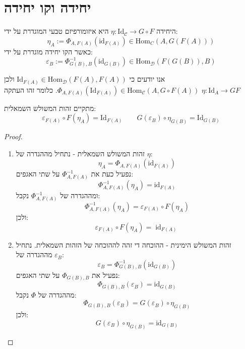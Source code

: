 \documentclass{tstextbook}
\begin{document}
\section{יחידה וקו יחידה}

\begin{definition}
היחידה \(\eta:\mathrm{Id}_{\mathcal{C}}\to G \circ F\) היא איזומורפיזם טבעי המוגדרת על ידי:
$$\eta_{A}:=\Phi_{A,F(A)}(\mathrm{id}_{F(A)})\in\mathrm{Hom}_{C}(A,G(F(A)))$$
כאשר הקו יחידה מוגדרת על ידי:
$$\varepsilon_{B}:=\Phi_{G(B),B}^{-1}(\mathrm{id}_{G(B)})\in\mathrm{Hom}_{\mathcal{D}}(F(G(B)),B)$$

\end{definition}
\begin{remark}
אנו יודעים כי \(\mathrm{Id}_{F(A)}\in\mathrm{Hom}_{\mathcal{D}}(F(A),F(A))\) ולכן \(\Phi_{A,F(A)}\left( \mathrm{Id}_{F(A)} \right)\in \mathrm{Hom}_{\mathcal{C}}\left( A,G\circ F(A) \right)\). כלומר זהו העתקה \(\eta:\mathrm{Id}_{A}\to GF\)

\end{remark}
\begin{proposition}
מתקיים זהות המשולש השמאלית:
$$\varepsilon_{F(A)}\circ  F(\eta_{A})=\mathrm{Id}_{F(A)}\qquad G(\varepsilon_{B})\circ \eta_{G(B)}=\mathrm{Id}_{G(B)}$$

\end{proposition}
\begin{proof}
  \begin{enumerate}
    \item זהות המשולש השמאלית - נתחיל מההגדרה של \(\eta\): 
$$\eta_{A}=\Phi_{A,F(A)}(\mathrm{id}_{F(A)})$$
נפעיל כעת את \(\Phi ^{-1}_{A,F(A)}\) על שתי האגפים:
$$\Phi_{A,F(A)}^{-1}(\eta_{A})=\mathrm{id}_{F(A)}$$
ומההגדרה של \(\Phi ^{-1}_{A,F(A)}\) נקבל:
$$\Phi_{A,F(A)}^{-1}(\eta_{A})=\varepsilon_{F(A)}\circ F(\eta_{A})$$
ולכן:
$$\varepsilon_{F(A)}\circ F(\eta_{A})=\operatorname{id}_{F(A)}$$


    \item זהות המשולש הימינית - ההוכחה די זהה לההוכחה של הזהות השמאלית. נתחיל מההגדרה של \(\varepsilon_{B}\): 
$$\varepsilon_{B}=\Phi_{G(B),B}^{-1}(\mathrm{id}_{G(B)})$$
נפעיל את \(\Phi_{G(B),B}\) על שתי האגפים:
$$\Phi_{G(B),B}(\varepsilon_{B})=\mathrm{id}_{G(B)}$$
מההגדרה של \(\Phi\) נקבל:
$$\Phi_{G(B),B}(\varepsilon_{B})=G(\varepsilon_{B})\circ\eta_{G(B)}$$
ולכן:
$$G(\varepsilon_{B})\circ\eta_{G(B)}=\mathrm{id}_{G(B)}$$


  \end{enumerate}
\end{proof}
\end{document}
